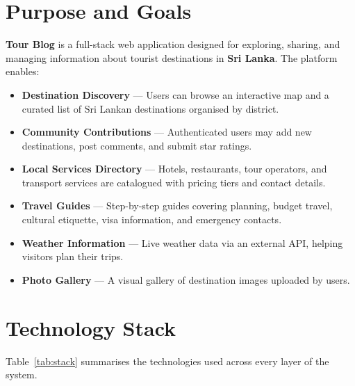 \documentclass[12pt,a4paper]{report}
\begin{document}
\section{Purpose and Goals}

\textbf{Tour Blog} is a full-stack web application designed for exploring, sharing, and managing information about tourist destinations in \textbf{Sri Lanka}. The platform enables:

\begin{itemize}[leftmargin=2em]
  \item \textbf{Destination Discovery} — Users can browse an interactive map and a curated list of Sri Lankan destinations organised by district.
  \item \textbf{Community Contributions} — Authenticated users may add new destinations, post comments, and submit star ratings.
  \item \textbf{Local Services Directory} — Hotels, restaurants, tour operators, and transport services are catalogued with pricing tiers and contact details.
  \item \textbf{Travel Guides} — Step-by-step guides covering planning, budget travel, cultural etiquette, visa information, and emergency contacts.
  \item \textbf{Weather Information} — Live weather data via an external API, helping visitors plan their trips.
  \item \textbf{Photo Gallery} — A visual gallery of destination images uploaded by users.
\end{itemize}

\section{Technology Stack}

Table~\ref{tab:stack} summarises the technologies used across every layer of the system.
\end{document}
